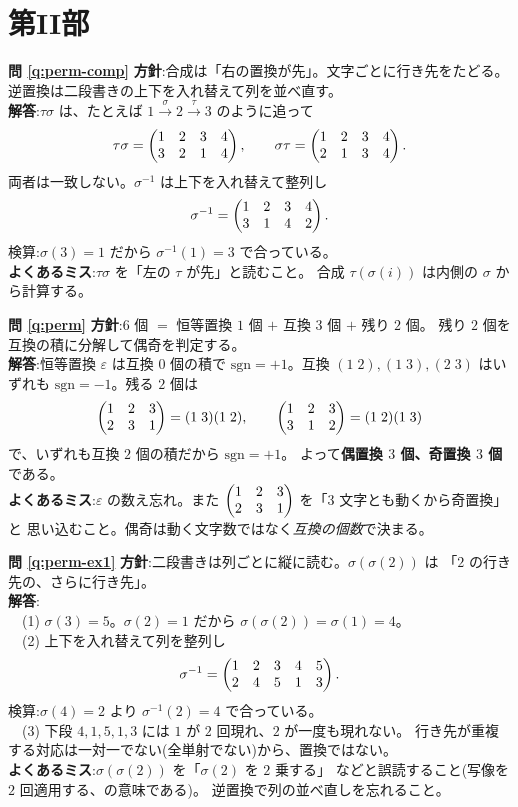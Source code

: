 \section*{第II部}

\noindent\textbf{問 \ref{q:perm-comp}}\quad
\textbf{方針}:合成は「右の置換が先」。文字ごとに行き先をたどる。
逆置換は二段書きの上下を入れ替えて列を並べ直す。\\
\textbf{解答}:$\tau\sigma$ は、たとえば
$1 \xrightarrow{\sigma} 2 \xrightarrow{\tau} 3$ のように追って
\[
\tau\sigma = \begin{pmatrix}1 & 2 & 3 & 4 \\ 3 & 2 & 1 & 4\end{pmatrix}, \qquad
\sigma\tau = \begin{pmatrix}1 & 2 & 3 & 4 \\ 2 & 1 & 3 & 4\end{pmatrix}.
\]
両者は一致しない。$\sigma^{-1}$ は上下を入れ替えて整列し
\[
\sigma^{-1} = \begin{pmatrix}1 & 2 & 3 & 4 \\ 3 & 1 & 4 & 2\end{pmatrix}.
\]
検算:$\sigma(3) = 1$ だから $\sigma^{-1}(1) = 3$ で合っている。\\
\textbf{よくあるミス}:$\tau\sigma$ を「左の $\tau$ が先」と読むこと。
合成 $\tau(\sigma(i))$ は内側の $\sigma$ から計算する。

\bigskip
\noindent\textbf{問 \ref{q:perm}}\quad
\textbf{方針}:$6$ 個 $=$ 恒等置換 $1$ 個 $+$ 互換 $3$ 個 $+$ 残り $2$ 個。
残り $2$ 個を互換の積に分解して偶奇を判定する。\\
\textbf{解答}:恒等置換 $\varepsilon$ は互換 $0$ 個の積で
$\mathrm{sgn} = +1$。互換 $(1\;2), (1\;3), (2\;3)$ はいずれも
$\mathrm{sgn} = -1$。残る $2$ 個は
\[
\begin{pmatrix}1 & 2 & 3 \\ 2 & 3 & 1\end{pmatrix} = (1\;3)(1\;2), \qquad
\begin{pmatrix}1 & 2 & 3 \\ 3 & 1 & 2\end{pmatrix} = (1\;2)(1\;3)
\]
で、いずれも互換 $2$ 個の積だから $\mathrm{sgn} = +1$。
よって\textbf{偶置換 $3$ 個、奇置換 $3$ 個}である。\\
\textbf{よくあるミス}:$\varepsilon$ の数え忘れ。また
$\begin{pmatrix}1 & 2 & 3 \\ 2 & 3 & 1\end{pmatrix}$ を「$3$ 文字とも動くから奇置換」と
思い込むこと。偶奇は動く文字数ではなく\emph{互換の個数}で決まる。

\bigskip
\noindent\textbf{問 \ref{q:perm-ex1}}\quad
\textbf{方針}:二段書きは列ごとに縦に読む。$\sigma(\sigma(2))$ は
「$2$ の行き先の、さらに行き先」。\\
\textbf{解答}:\\
　(1) $\sigma(3) = 5$。$\sigma(2) = 1$ だから
$\sigma(\sigma(2)) = \sigma(1) = 4$。\\
　(2) 上下を入れ替えて列を整列し
\[
\sigma^{-1} = \begin{pmatrix}1 & 2 & 3 & 4 & 5 \\ 2 & 4 & 5 & 1 & 3\end{pmatrix}.
\]
検算:$\sigma(4) = 2$ より $\sigma^{-1}(2) = 4$ で合っている。\\
　(3) 下段 $4, 1, 5, 1, 3$ には $1$ が $2$ 回現れ、$2$ が一度も現れない。
行き先が重複する対応は一対一でない(全単射でない)から、置換ではない。\\
\textbf{よくあるミス}:$\sigma(\sigma(2))$ を「$\sigma(2)$ を $2$ 乗する」
などと誤読すること(写像を $2$ 回適用する、の意味である)。
逆置換で列の並べ直しを忘れること。

